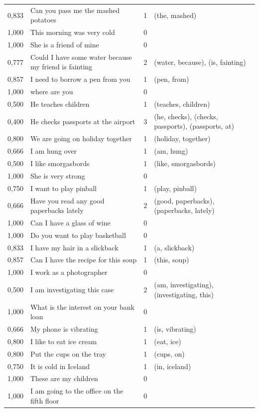 \documentclass[a4paper,12pt]{article}
\begin{document}
\begin{landscape}
\begin{longtable}{l l r l}
0,833 & Can you pass me the mashed potatoes & 1 & (the, mashed) \\
1,000 & This morning was very cold & 0 &  \\
1,000 & She is a friend of mine & 0 &  \\
0,777 & Could I have some water because my friend is fainting & 2 & (water, because), (is, fainting) \\
0,857 & I need to borrow a pen from you & 1 & (pen, from) \\
1,000 & where are you & 0 &  \\
0,500 & He teaches children & 1 & (teaches, children) \\
0,400 & He checks passports at the airport & 3 & (he, checks), (checks, passports), (passports, at) \\
0,800 & We are going on holiday together & 1 & (holiday, together) \\
0,666 & I am hung over & 1 & (am, hung) \\
0,500 & I like smorgasbords & 1 & (like, smorgasbords) \\
1,000 & She is very strong & 0 &  \\
0,750 & I want to play pinball & 1 & (play, pinball) \\
0,666 & Have you read any good paperbacks lately & 2 & (good, paperbacks), (paperbacks, lately) \\
1,000 & Can I have a glass of wine & 0 &  \\
1,000 & Do you want to play basketball & 0 &  \\
0,833 & I have my hair in a slickback & 1 & (a, slickback) \\
0,857 & Can I have the recipe for this soup & 1 & (this, soup) \\
1,000 & I work as a photographer & 0 &  \\
0,500 & I am investigating this case & 2 & (am, investigating), (investigating, this) \\
1,000 & What is the interest on your bank loan & 0 &  \\
0,666 & My phone is vibrating & 1 & (is, vibrating) \\
0,800 & I like to eat ice cream & 1 & (eat, ice) \\
0,800 & Put the cups on the tray & 1 & (cups, on) \\
0,750 & It is cold in Iceland & 1 & (in, iceland) \\
1,000 & These are my children & 0 &  \\
1,000 & I am going to the office on the fifth floor & 0 &  \\

\end{longtable}
\end{landscape}
\end{document}
